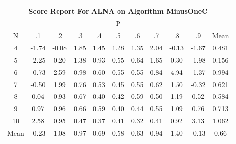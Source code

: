 \documentclass[11pt,a4paper]{report}
\begin{document}
\begin{longtable}{ | c || c | c | c | c | c | c | c | c | c || c |}
\hline
\multicolumn{11}{|c|}{ Score Report For ALNA on Algorithm MinusOneC} \\
\hline
\multicolumn{11}{|c|}{ P } \\
\hline
N & .1 & .2 & .3 & .4 & .5 & .6 & .7 & .8 & .9 & Mean\\
 \hline
 \hline
 \endhead
  4 &  \cellcolor[HTML]{FFD7D7} -1.74 &  \cellcolor[HTML]{FFFFFF} -0.08 &  \cellcolor[HTML]{CFCFFF} 1.85 &  \cellcolor[HTML]{D7D7FF} 1.45 &  \cellcolor[HTML]{DFDFFF} 1.28 &  \cellcolor[HTML]{DFDFFF} 1.35 &  \cellcolor[HTML]{CFCFFF} 2.04 &  \cellcolor[HTML]{FFFFFF} -0.13 &  \cellcolor[HTML]{FFD7D7} -1.67 & 0.481 \\
  5 &  \cellcolor[HTML]{FFC7C7} -2.25 &  \cellcolor[HTML]{F7F7FF} 0.20 &  \cellcolor[HTML]{DFDFFF} 1.38 &  \cellcolor[HTML]{E7E7FF} 0.93 &  \cellcolor[HTML]{EFEFFF} 0.55 &  \cellcolor[HTML]{EFEFFF} 0.64 &  \cellcolor[HTML]{D7D7FF} 1.65 &  \cellcolor[HTML]{F7F7FF} 0.30 &  \cellcolor[HTML]{FFCFCF} -1.98 & 0.156 \\
  6 &  \cellcolor[HTML]{FFEFEF} -0.73 &  \cellcolor[HTML]{BFBFFF} 2.59 &  \cellcolor[HTML]{E7E7FF} 0.98 &  \cellcolor[HTML]{EFEFFF} 0.60 &  \cellcolor[HTML]{EFEFFF} 0.55 &  \cellcolor[HTML]{EFEFFF} 0.55 &  \cellcolor[HTML]{E7E7FF} 0.84 &  \cellcolor[HTML]{8080FF} 4.94 &  \cellcolor[HTML]{FFDFDF} -1.37 & 0.994 \\
  7 &  \cellcolor[HTML]{FFEFEF} -0.50 &  \cellcolor[HTML]{CFCFFF} 1.99 &  \cellcolor[HTML]{EFEFFF} 0.76 &  \cellcolor[HTML]{EFEFFF} 0.53 &  \cellcolor[HTML]{F7F7FF} 0.45 &  \cellcolor[HTML]{EFEFFF} 0.55 &  \cellcolor[HTML]{EFEFFF} 0.62 &  \cellcolor[HTML]{D7D7FF} 1.50 &  \cellcolor[HTML]{FFF7F7} -0.32 & 0.621 \\
  8 &  \cellcolor[HTML]{FFFFFF} 0.04 &  \cellcolor[HTML]{E7E7FF} 0.93 &  \cellcolor[HTML]{EFEFFF} 0.67 &  \cellcolor[HTML]{F7F7FF} 0.40 &  \cellcolor[HTML]{F7F7FF} 0.42 &  \cellcolor[HTML]{EFEFFF} 0.59 &  \cellcolor[HTML]{EFEFFF} 0.50 &  \cellcolor[HTML]{DFDFFF} 1.19 &  \cellcolor[HTML]{EFEFFF} 0.52 & 0.584 \\
  9 &  \cellcolor[HTML]{E7E7FF} 0.97 &  \cellcolor[HTML]{E7E7FF} 0.96 &  \cellcolor[HTML]{EFEFFF} 0.66 &  \cellcolor[HTML]{EFEFFF} 0.59 &  \cellcolor[HTML]{F7F7FF} 0.40 &  \cellcolor[HTML]{F7F7FF} 0.44 &  \cellcolor[HTML]{EFEFFF} 0.55 &  \cellcolor[HTML]{E7E7FF} 1.09 &  \cellcolor[HTML]{EFEFFF} 0.76 & 0.713 \\
  10 &  \cellcolor[HTML]{BFBFFF} 2.58 &  \cellcolor[HTML]{E7E7FF} 0.95 &  \cellcolor[HTML]{F7F7FF} 0.47 &  \cellcolor[HTML]{F7F7FF} 0.37 &  \cellcolor[HTML]{F7F7FF} 0.41 &  \cellcolor[HTML]{F7F7FF} 0.32 &  \cellcolor[HTML]{F7F7FF} 0.41 &  \cellcolor[HTML]{E7E7FF} 0.92 &  \cellcolor[HTML]{AFAFFF} 3.13 & 1.062 \\
 \hline
 \hline
Mean &  \cellcolor[HTML]{FFF7F7} -0.23 &  \cellcolor[HTML]{E7E7FF} 1.08 &  \cellcolor[HTML]{E7E7FF} 0.97 &  \cellcolor[HTML]{EFEFFF} 0.69 &  \cellcolor[HTML]{EFEFFF} 0.58 &  \cellcolor[HTML]{EFEFFF} 0.63 &  \cellcolor[HTML]{E7E7FF} 0.94 &  \cellcolor[HTML]{DFDFFF} 1.40 &  \cellcolor[HTML]{FFFFFF} -0.13 &  \cellcolor[HTML]{EFEFFF} 0.66
\end{longtable}
\end{document}
